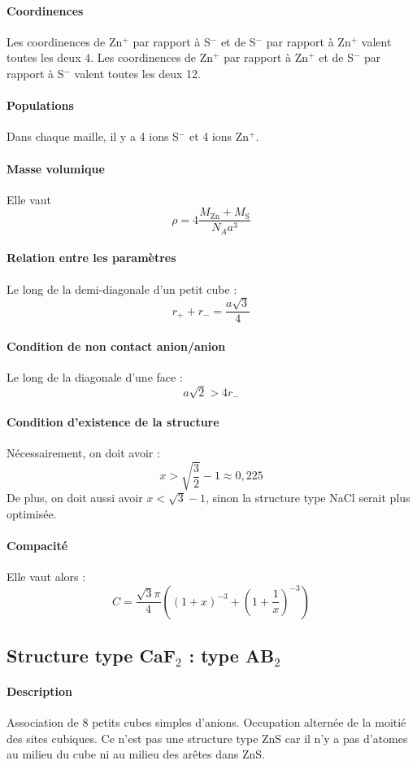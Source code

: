 \documentclass[french]{book}
\theoremstyle{plain}
\theoremstyle{definition}
\theoremstyle{remark}
\begin{document}
\paragraph{Coordinences} Les coordinences de Zn$^+$ par rapport à S$^-$ et de S$^-$ par rapport à Zn$^+$ valent toutes les deux $4$. Les coordinences de Zn$^+$ par rapport à Zn$^+$ et de S$^-$ par rapport à S$^-$ valent toutes les deux 12.
\paragraph{Populations} Dans chaque maille, il y a 4 ions S$^-$ et 4 ions Zn$^+$.
\paragraph{Masse volumique} Elle vaut $$\rho=4\frac{M_{\text{Zn}}+M_\text{S}}{N_Aa^3}$$
\paragraph{Relation entre les paramètres} Le long de la demi-diagonale d'un petit cube : $$r_++r_-=\frac{a\sqrt{3}}{4}$$
\paragraph{Condition de non contact anion/anion} Le long de la diagonale d'une face : $$a\sqrt{2}>4r_-$$
\paragraph{Condition d'existence de la structure} Nécessairement, on doit avoir : $$x>\sqrt{\frac{3}{2}}-1\approx 0,225$$ De plus, on doit aussi avoir $x<\sqrt{3}-1$, sinon la structure type NaCl serait plus optimisée.
\paragraph{Compacité} Elle vaut alors : $$C=\frac{\sqrt{3}\pi}{4}\left(\left(1+x\right)^{-3}+\left(1+\frac{1}{x}\right)^{-3}\right)$$

\subsection{Structure type CaF$_2$ : type AB$_2$}
\paragraph{Description} Association de 8 petits cubes simples d'anions. Occupation alternée de la moitié des sites cubiques. Ce n'est pas une structure type ZnS car il n'y a pas d'atomes au milieu du cube ni au milieu des arêtes dans ZnS.
\end{document}
